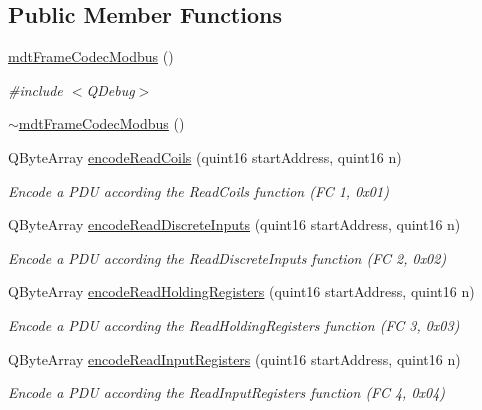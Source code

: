 \subsection*{Public Member Functions}
\begin{DoxyCompactItemize}
\item 
\hyperlink{classmdt_frame_codec_modbus_a42e71f7bff4e4caabe140a27bdf258f4}{mdt\-Frame\-Codec\-Modbus} ()
\begin{DoxyCompactList}\small\item\em \#include $<$\-Q\-Debug$>$ \end{DoxyCompactList}\item 
\hyperlink{classmdt_frame_codec_modbus_aae3833f91027dc8df1b2f2df2b266427}{$\sim$mdt\-Frame\-Codec\-Modbus} ()
\item 
Q\-Byte\-Array \hyperlink{classmdt_frame_codec_modbus_adf0a4d583aeff7b818dda94514c594f0}{encode\-Read\-Coils} (quint16 start\-Address, quint16 n)
\begin{DoxyCompactList}\small\item\em Encode a P\-D\-U according the Read\-Coils function (F\-C 1, 0x01) \end{DoxyCompactList}\item 
Q\-Byte\-Array \hyperlink{classmdt_frame_codec_modbus_ad14a2d6c124cca157670595978e06150}{encode\-Read\-Discrete\-Inputs} (quint16 start\-Address, quint16 n)
\begin{DoxyCompactList}\small\item\em Encode a P\-D\-U according the Read\-Discrete\-Inputs function (F\-C 2, 0x02) \end{DoxyCompactList}\item 
Q\-Byte\-Array \hyperlink{classmdt_frame_codec_modbus_a19cac6dd7bd9078c6ab53ee2a891e537}{encode\-Read\-Holding\-Registers} (quint16 start\-Address, quint16 n)
\begin{DoxyCompactList}\small\item\em Encode a P\-D\-U according the Read\-Holding\-Registers function (F\-C 3, 0x03) \end{DoxyCompactList}\item 
Q\-Byte\-Array \hyperlink{classmdt_frame_codec_modbus_aabcadb20524749274eaf285561960aed}{encode\-Read\-Input\-Registers} (quint16 start\-Address, quint16 n)
\begin{DoxyCompactList}\small\item\em Encode a P\-D\-U according the Read\-Input\-Registers function (F\-C 4, 0x04) \end{DoxyCompactList}\item 

\end{DoxyCompactItemize}
